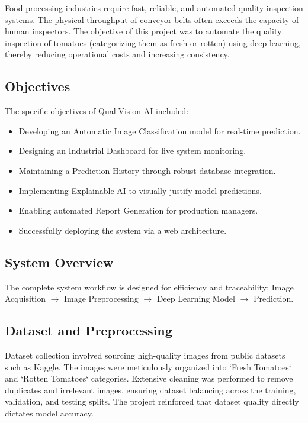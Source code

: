 Food processing industries require fast, reliable, and automated quality inspection systems. The physical throughput of conveyor belts often exceeds the capacity of human inspectors. The objective of this project was to automate the quality inspection of tomatoes (categorizing them as fresh or rotten) using deep learning, thereby reducing operational costs and increasing consistency.

\subsection{Objectives}

The specific objectives of QualiVision AI included:
\begin{itemize}[leftmargin=1.5cm]
    \item Developing an Automatic Image Classification model for real-time prediction.
    \item Designing an Industrial Dashboard for live system monitoring.
    \item Maintaining a Prediction History through robust database integration.
    \item Implementing Explainable AI to visually justify model predictions.
    \item Enabling automated Report Generation for production managers.
    \item Successfully deploying the system via a web architecture.
\end{itemize}

\subsection{System Overview}

The complete system workflow is designed for efficiency and traceability:
Image Acquisition $\rightarrow$ Image Preprocessing $\rightarrow$ Deep Learning Model $\rightarrow$ Prediction.

\subsection{Dataset and Preprocessing}

Dataset collection involved sourcing high-quality images from public datasets such as Kaggle. The images were meticulously organized into `Fresh Tomatoes` and `Rotten Tomatoes` categories. Extensive cleaning was performed to remove duplicates and irrelevant images, ensuring dataset balancing across the training, validation, and testing splits. The project reinforced that dataset quality directly dictates model accuracy.

